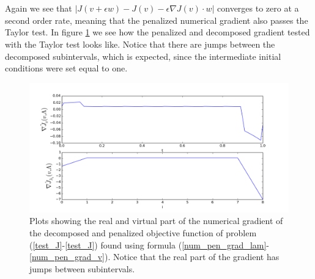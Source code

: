 \\
\\
Again we see that $|J(v+\epsilon w)-J(v)-\epsilon \nabla J(v)\cdot w|$ converges to zero at a second order rate, meaning that the penalized numerical gradient also passes the Taylor test. In figure \ref{JGrad2} we see how the penalized and decomposed gradient tested with the Taylor test looks like. Notice that there are jumps between the decomposed subintervals, which is expected, since the intermediate initial conditions were set equal to one.
\begin{figure}[!h]
\centering
\includegraphics[scale=0.5]{pen_num_grad.png}
\caption{Plots showing the real and virtual part of the numerical gradient of the decomposed and penalized objective function of problem (\ref{test_J}-\ref{test_J}) found using formula (\ref{num_pen_grad_lam}-\ref{num_pen_grad_v}). Notice that the real part of the gradient has jumps between subintervals.}
\label{JGrad2}
\end{figure}
